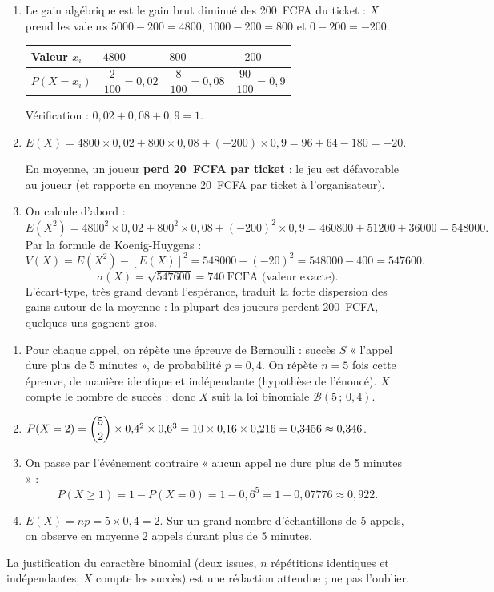 \documentclass[11pt]{article}
\newcommand{\cle}[1]{{\popxbold\color{popdark}#1}}
\begin{document}
\begin{corrige}
\begin{enumerate}
\item Le gain algébrique est le gain brut diminué des \SI{200}{FCFA} du ticket : $X$ prend les valeurs $5000-200=4800$, $1000-200=800$ et $0-200=-200$.
\begin{center}
\begin{tabularx}{\linewidth}{|l|X|X|X|}
\hline
\rowcolor{popblueL} Valeur $x_i$ & $4800$ & $800$ & $-200$ \\
\hline
$P(X=x_i)$ & $\dfrac{2}{100}=0{,}02$ & $\dfrac{8}{100}=0{,}08$ & $\dfrac{90}{100}=0{,}9$ \\
\hline
\end{tabularx}
\end{center}
Vérification : $0{,}02+0{,}08+0{,}9=1$.
\item $E(X)=4800\times 0{,}02+800\times 0{,}08+(-200)\times 0{,}9=96+64-180=-20$.

En moyenne, un joueur \textbf{perd \SI{20}{FCFA} par ticket} : le jeu est défavorable au joueur (et rapporte en moyenne \SI{20}{FCFA} par ticket à l'organisateur).
\item On calcule d'abord :
\[E(X^2)=4800^2\times 0{,}02+800^2\times 0{,}08+(-200)^2\times 0{,}9=460800+51200+36000=548000.\]
Par la formule de \cle{Koenig-Huygens} :
\[V(X)=E(X^2)-[E(X)]^2=548000-(-20)^2=548000-400=547600.\]
\[\sigma(X)=\sqrt{547600}=740\ \text{FCFA (valeur exacte)}.\]
L'écart-type, très grand devant l'espérance, traduit la forte dispersion des gains autour de la moyenne : la plupart des joueurs perdent \SI{200}{FCFA}, quelques-uns gagnent gros.
\end{enumerate}
\end{corrige}

\begin{corrige}
\begin{enumerate}
\item Pour chaque appel, on répète une épreuve de Bernoulli : succès $S$ « l'appel dure plus de 5 minutes », de probabilité $p=0{,}4$. On répète $n=5$ fois cette épreuve, de manière identique et indépendante (hypothèse de l'énoncé). $X$ compte le nombre de succès : donc $X$ suit la loi binomiale $\mathcal{B}(5\,;\,0{,}4)$.
\item $P(X=2)=\dbinom{5}{2}\times 0{,}4^2\times 0{,}6^3=10\times 0{,}16\times 0{,}216=0{,}3456\approx 0{,}346$.
\item On passe par l'événement contraire « aucun appel ne dure plus de 5 minutes » :
\[P(X\ge 1)=1-P(X=0)=1-0{,}6^5=1-0{,}07776\approx 0{,}922.\]
\item $E(X)=np=5\times 0{,}4=2$. Sur un grand nombre d'échantillons de 5 appels, on observe en moyenne 2 appels durant plus de 5 minutes.
\end{enumerate}
\begin{attention}
La justification du caractère binomial (deux issues, $n$ répétitions identiques et indépendantes, $X$ compte les succès) est une rédaction attendue ; ne pas l'oublier.
\end{attention}
\end{corrige}
\end{document}

